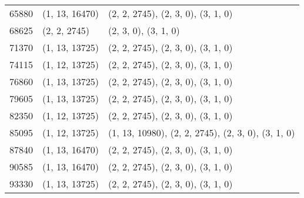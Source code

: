 \begin{enumerate}
\begin{center}
\begin{longtable}{|l|l|l|}
65880 & (1, 13, 16470) & (2, 2, 2745), (2, 3, 0), (3, 1, 0) \\
68625 & (2, 2, 2745) & (2, 3, 0), (3, 1, 0) \\
71370 & (1, 13, 13725) & (2, 2, 2745), (2, 3, 0), (3, 1, 0) \\
74115 & (1, 12, 13725) & (2, 2, 2745), (2, 3, 0), (3, 1, 0) \\
76860 & (1, 13, 13725) & (2, 2, 2745), (2, 3, 0), (3, 1, 0) \\
79605 & (1, 13, 13725) & (2, 2, 2745), (2, 3, 0), (3, 1, 0) \\
82350 & (1, 12, 13725) & (2, 2, 2745), (2, 3, 0), (3, 1, 0) \\
85095 & (1, 12, 13725) & (1, 13, 10980), (2, 2, 2745), (2, 3, 0), (3, 1, 0) \\
87840 & (1, 13, 16470) & (2, 2, 2745), (2, 3, 0), (3, 1, 0) \\
90585 & (1, 13, 16470) & (2, 2, 2745), (2, 3, 0), (3, 1, 0) \\
93330 & (1, 13, 13725) & (2, 2, 2745), (2, 3, 0), (3, 1, 0) \\
\end{longtable}
\end{center}
\end{enumerate}
